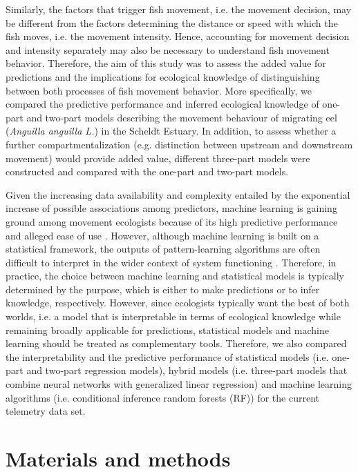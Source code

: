 \documentclass[preprint,12pt,authoryear]{elsarticle}
\begin{document}
Similarly, the factors that trigger fish movement, i.e. the movement decision, may be different from the factors determining the distance or speed with which the fish moves, i.e. the movement intensity. Hence, accounting for movement decision and intensity separately may also be necessary to understand fish movement behavior. Therefore, the aim of this study was to assess the added value for predictions and the implications for ecological knowledge of distinguishing between both processes of fish movement behavior. More specifically, we compared the predictive performance and inferred ecological knowledge of one-part and two-part models describing the movement behaviour of migrating eel (\textit{Anguilla anguilla L.}) in the Scheldt Estuary. In addition, to assess whether a further compartmentalization (e.g. distinction between upstream and downstream movement) would provide added value, different three-part models were constructed and compared with the one-part and two-part models. 

Given the increasing data availability and complexity entailed by the exponential increase of possible associations among predictors, machine learning is gaining ground among movement ecologists because of its high predictive performance and alleged ease of use \citep{Joseph2017ApplicationsStudies,Wang2019MachineData}. However, although machine learning is built on a statistical framework, the outputs of pattern-learning algorithms are often difficult to interpret in the wider context of system functioning \citep{Bzdok2018PointsLearning}. Therefore, in practice, the choice between machine learning and statistical models is typically determined by the purpose, which is either to make predictions or to infer knowledge, respectively. However, since ecologists typically want the best of both worlds, i.e. a model that is interpretable in terms of ecological knowledge while remaining broadly applicable for predictions, statistical models and machine learning should be treated as complementary tools. Therefore, we also compared the interpretability and the predictive performance of statistical models (i.e. one-part and two-part regression models), hybrid models (i.e. three-part models that combine neural networks with generalized linear regression) and machine learning algorithms (i.e. conditional inference random forests (RF)) for the current telemetry data set.

\section{Materials and methods}
\end{document}
